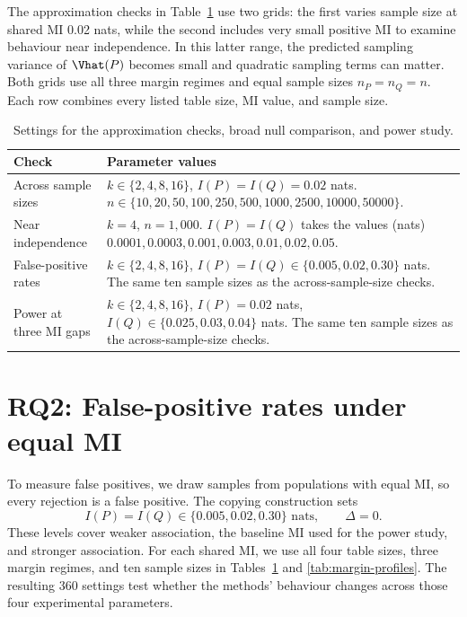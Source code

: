 The approximation checks in Table~\ref{tab:design-primary-grids} use two grids:
the first varies
sample size at shared MI 0.02 nats, while the second includes very small
positive MI to examine behaviour near independence. In this latter range,
the predicted sampling variance of \(\Vhat(P)\) becomes small and
quadratic sampling terms can matter. Both grids use all
three margin regimes and equal sample sizes \(n_P=n_Q=n\). Each row
combines every listed table size, MI value, and sample size.

\begin{table}[!htbp]
\centering
\caption{Settings for the approximation checks, broad null comparison, and power study.}
\label{tab:design-primary-grids}
\thesistableformat
\begin{tabularx}{\textwidth}{@{}>{\raggedright\arraybackslash}p{}>{\raggedright\arraybackslash}X@{}}
\toprule
\textbf{Check} & \textbf{Parameter values}\\
\midrule
Across sample sizes &
\(k\in\{2,4,8,16\}\), \(I(P)=I(Q)=0.02\) nats.\newline
\(n\in\{10,20,50,100,250,500,1000,2500,10000,50000\}\).\\
\addlinespace
Near independence &
\(k=4\), \(n=1{,}000\).\newline
\(I(P)=I(Q)\) takes the values (nats)\newline
\(0.0001,0.0003,0.001,0.003,0.01,0.02,0.05\).\\
\addlinespace
False-positive rates &
\(k\in\{2,4,8,16\}\), \(I(P)=I(Q)\in\{0.005,0.02,0.30\}\) nats.\newline
The same ten sample sizes as the across-sample-size checks.\\
\addlinespace
Power at three MI gaps &
\(k\in\{2,4,8,16\}\), \(I(P)=0.02\) nats,\newline
\(I(Q)\in\{0.025,0.03,0.04\}\) nats.\newline
The same ten sample sizes as the across-sample-size checks.\\
\bottomrule
\end{tabularx}
\end{table}

\section{RQ2: False-positive rates under equal MI}
\label{sec:null-design}

To measure false positives, we draw samples from populations with equal
MI, so every rejection is a false positive. The copying construction
sets
\begin{equation}
 I(P)=I(Q)\in\{0.005,0.02,0.30\}\text{ nats},
 \qquad \Delta=0.
 \label{eq:design-balanced-null}
\end{equation}
These levels cover weaker association, the baseline MI used for the power
study, and stronger association. For each shared MI, we use all four
table sizes, three margin regimes, and ten sample sizes in
Tables~\ref{tab:design-primary-grids} and \ref{tab:margin-profiles}.
The resulting 360 settings test whether the methods' behaviour changes
across those four experimental parameters.


